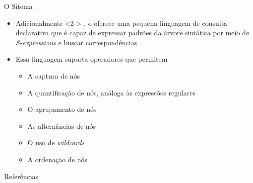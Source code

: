 \documentclass
  [ aspectratio=169,
    english,
    hyperref={citecolor=blue,colorlinks=true,linkcolor=blue,urlcolor=blue},
    brazil]
  {beamer}
\begin{document}
  \begin{frame}{O Sitema \treesitter}
    \begin{itemize}
      \item<1-> Adicionalmente%
                \onslide
                  <2->
                  {%
                    , o \treesitter oferece uma pequena linguagem de consulta
                    declarativa que é capaz de expressar padrões da árvore
                    sintática por meio de \textit{S-expressions} e buscar
                    correspondências}
      \item<3-> Essa linguagem suporta operadores que permitem
                \begin{itemize}
                  \item<4-> A captura de nós
                  \item<5-> A quantificação de nós, análoga às expressões
                            regulares
                  \item<6-> O agrupamento de nós
                  \item<7-> As alternâncias de nós
                  \item<8-> O uso de \textit{wildcards}
                  \item<9-> A ordenação de nós
                \end{itemize}
    \end{itemize}
  \end{frame}


  \begin{frame}[allowframebreaks]{Referências}\printbibliography\end{frame}
\end{document}
